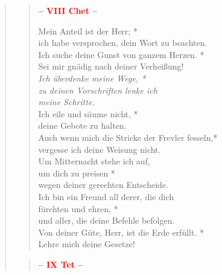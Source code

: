 

\begin{quote}
\begin{verse}

\begin{center}
 \textcolor{red}{\normalsize\bf – VIII Chet –}\\
\end{center} 

Mein Anteil ist der Herr; *\\
ich habe versprochen, dein Wort zu beachten.\\ 
\vin Ich suche deine Gunst von ganzem Herzen. *\\ 
\vin Sei mir gnädig nach deiner Verheißung!\\
\textit{Ich überdenke meine Wege, *\\
zu deinen Vorschriften lenke ich\\
meine Schritte.}\\ 
\vin Ich eile und säume nicht, *\\ 
\vin deine Gebote zu halten.\\
Auch wenn mich die Stricke der Frevler fesseln,*\\
vergesse ich deine Weisung nicht.\\ 
\vin Um Mitternacht stehe ich auf,\\ 
\vin um dich zu preisen *\\ 
\vin wegen deiner gerechten Entscheide.\\ 
Ich bin ein Freund all derer, die dich\\
fürchten und ehren, *\\
und aller, die deine Befehle befolgen.\\ 
\vin Von deiner Güte, Herr, ist die Erde erfüllt. *\\ 
\vin Lehre mich deine Gesetze!\\ 
\end{verse}

\begin{verse}

\begin{center}
 \textcolor{red}{\normalsize\bf – IX Tet –}\\
\end{center} 


\end{verse}
\end{quote}

